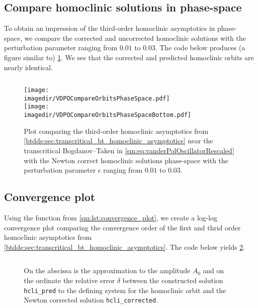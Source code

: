\subsection{Compare homoclinic solutions in phase-space}
To obtain an impression of the third-order homoclinic asymptotics in
phase-space, we compare the corrected and uncorrected homoclinic solutions
with the perturbation parameter ranging from $0.01$ to $0.03$.
The code below produces (a figure similar to) \cref{sm:fig:VDPOCompareOrbitsPhaseSpace}.
We see that the corrected and predicted homoclinic orbits are nearly identical.
\inputminted[firstline=203, lastline=230]{MATLAB}{\pathToDDEBifToolDemos/vdpo_bt_transcritical/vanderPolOscillator.m}
%
\begin{figure}[ht!]
    \centering
    \texttt{[image: \\imagedir/VDPOCompareOrbitsPhaseSpace.pdf]} \\
    \vspace*{20pt}
    \texttt{[image: \\imagedir/VDPOCompareOrbitsPhaseSpaceBottom.pdf]}
    \caption{Plot comparing the third-order homoclinic asymptotics from
        \cref{btdde:sec:transcritical_bt_homoclinic_asymptotics} near the
        transcritical Bogdanov--Taken in
        \cref{sm:eq:vanderPolOscillatorRescaled} with the Newton correct
        homoclinic solutions phase-space with the perturbation parameter
        $\epsilon$ ranging from $0.01$ to $0.03$.}
    \label{sm:fig:VDPOCompareOrbitsPhaseSpace}
\end{figure}

\subsection{Convergence plot}
\label{sm:sec:vdpo:convergence_plot}
Using the function from \cref{sm:lst:convergence_plot}, we create a log-log
convergence plot comparing the convergence order of the first and thrid order
homoclinic asymptotics from \cref{btdde:sec:transcritical_bt_homoclinic_asymptotics}.
The code below yields \cref{sm:fig:VDPOConvergencePlot}.
\inputminted[firstline=232, lastline=243]{MATLAB}{\pathToDDEBifToolDemos/vdpo_bt_transcritical/vanderPolOscillator.m}
%
\begin{figure}[ht]
    \centering
        \caption{On the abscissa is the approximation to the amplitude $A_0$ and on
        the ordinate the relative error $\delta$ between the constructed solution
        \texttt{hcli_pred} to the defining system for the homoclinic orbit
        and the Newton corrected solution \texttt{hcli_corrected}.}
    \label{sm:fig:VDPOConvergencePlot}
\end{figure}

